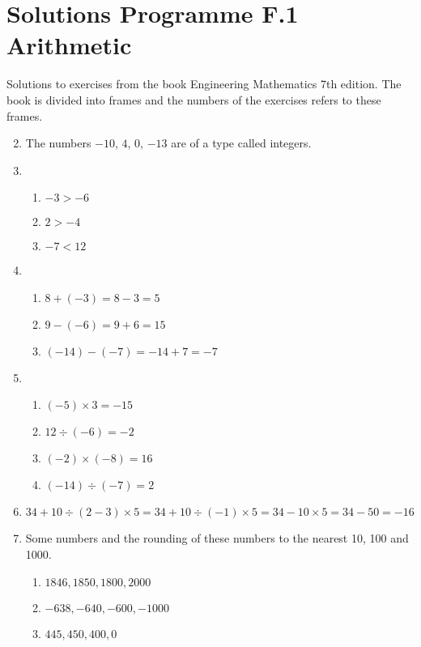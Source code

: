 \documentclass[fleqn]{article}
\begin{document}
\section*{Solutions Programme F.1 Arithmetic}
Solutions to exercises from the book Engineering Mathematics 7th edition. The book is divided into frames and the numbers of the exercises refers to these frames.

\begin{enumerate}[label=\textbf{\arabic*.}]

\setcounter{enumi}{1}
\item The numbers $-10$, $4$, $0$, $-13$ are of a type called integers.

\item

\begin{enumerate}[label=\textbf{(\alph*)}]
\item $-3 > -6$
\item $2 > -4$
\item $-7 < 12$
\end{enumerate} 

\setcounter{enumi}{4}
\item

\begin{enumerate}[label=\textbf{(\alph*)}]
\item $8 + (-3) = 8 - 3 = 5$
\item $9 - (-6) = 9 + 6 = 15$
\item $(-14) - (-7) = -14 + 7 = -7$
\end{enumerate}

\setcounter{enumi}{6}
\item

\begin{enumerate}[label=\textbf{(\alph*)}]
\item $(-5) \times 3 = -15$
\item $12 \div (-6) = -2$
\item $(-2) \times (-8) = 16$
\item $(-14) \div (-7) = 2$
\end{enumerate}

\setcounter{enumi}{8}
\item $34 + 10 \div (2 - 3) \times 5 = 
34 + 10 \div (-1) \times 5 = 
34 -10 \times 5 = 
34 - 50 = -16$

\setcounter{enumi}{12}
\item Some numbers and the rounding of these numbers to the nearest 10, 100 and 1000. 
\begin{enumerate}[label=\textbf{(\alph*)}]
\item $ 1846, 1850, 1800, 2000 $
\item $ -638, -640, -600, -1000 $
\item $ 445, 450, 400, 0 $
\end{enumerate}


\end{enumerate}
\end{document}
